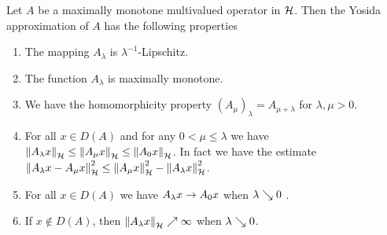 \begin{proposition}\label{proposition:prop of Yos app}
	Let $ A $ be a maximally monotone multivalued operator in $ \mathcal{H} $. Then
	the Yosida approximation of $ A $ has the following properties
	\begin{enumerate}[label=(\roman*)]
		\item The mapping $ A_\lambda $ is $ \lambda^{-1} $-Lipschitz.
		\item The function $ A_\lambda $ is maximally monotone.
		\item We have the homomorphicity property 
		$ (A_\mu)_\lambda=A_{\mu+\lambda} $ 
		for $ \lambda,\mu >0 $.
		\item For all $ x\in D(A) $ and for any $ 0<\mu\leq \lambda $ 
		we have
		$ \left\Vert A_\lambda x\right\Vert_{\mathcal{H}}\leq\left\Vert A_\mu x\right\Vert_{\mathcal{H}}\leq \left\Vert A_0 x\right\Vert_{\mathcal{H}} $.
		In fact we have the estimate
		 $ \left\Vert  A_\lambda x- A_\mu x\right\Vert_{\mathcal{H}}^2
		\leq \left\Vert  A_\mu x\right\Vert_{\mathcal{H}}^2-\left\Vert  A_\lambda x\right\Vert_{\mathcal{H}}^2$.
		\item For all $ x\in D(A) $ we have $ A_\lambda x \rightarrow A_0 x $ 
		when $ \lambda \searrow 0 $ .
		\item If $ x\notin D(A) $, then $ \left\Vert A_\lambda x\right\Vert_{\mathcal{H}} \nearrow \infty $ when 
		$ \lambda \searrow 0 $.
	\end{enumerate}
\end{proposition}
